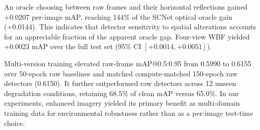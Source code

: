 \documentclass[runningheads]{llncs}
\begin{document}
An oracle choosing between raw frames and their horizontal reflections gained +0.0207 per-image mAP, reaching 144\% of the SCNet optical oracle gain (+0.0144). This indicates that detector sensitivity to spatial alterations accounts for an appreciable fraction of the apparent oracle gap. Four-view WBF yielded +0.0023 mAP over the full test set (95\% CI $[+0.0014, +0.0051]$).

Multi-version training elevated raw-frame mAP@0.5:0.95 from 0.5990 to 0.6155 over 50-epoch raw baselines and matched compute-matched 150-epoch raw detectors (0.6150). It further outperformed raw detectors across 12 unseen degradation conditions, retaining 68.5\% of clean mAP versus 65.0\%. In our experiments, enhanced imagery yielded its primary benefit as multi-domain training data for environmental robustness rather than as a per-image test-time choice.

{\setlength{\bibitemsep}{0.3ex}
\printbibliography}
\end{document}
